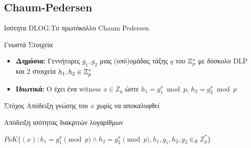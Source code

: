 \documentclass[handout]{beamer}
\begin{document}
\subsection{Chaum-Pedersen}
\begin{frame}[allowframebreaks]{Ισότητα DLOG:Το πρωτόκολλο Chaum Pedersen}
\begin{block}{Γνωστά Στοιχεία}
\begin{itemize}
\item \textbf{Δημόσια:} Γεννήτορες $g_1, g_2$ μιας (υπό)ομάδας τάξης $q$ του $\mathbb{Z}^*_{p}$ με δύσκολο DLP και 2 στοιχεία $h_1, h_2 \in \mathbb{Z}^*_{p}$ 
\item \textbf{Ιδιωτικά:} O \prv έχει ένα witness $x \in \mathbb{Z}_q$  ώστε $h_1 = g_{1}^{x} \bmod{p}$, $h_2 = g_{2}^{x} \bmod{p}$
\end{itemize}
\end{block}

\begin{block}{Στόχος}
Απόδειξη γνώσης του $x$ χωρίς να αποκαλυφθεί

Απόδειξη ισότητας διακριτών λογαρίθμων
\end{block}

\begin{small}
$PoK \{(x): h_1 = g_1^x \pmod{p} \wedge h_2 = g_2^x \pmod{p},  h_1,g_1,h_2,g_2 \in_R \mathbb{Z}_p^* \}$
\end{small}

\begin{columns}


\end{columns}
\end{frame}
\end{document}
